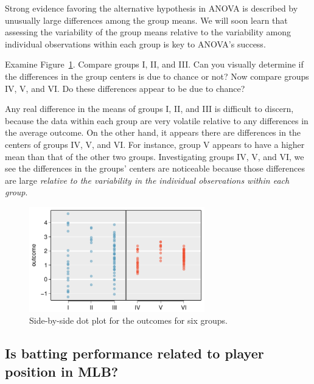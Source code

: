 Strong evidence favoring the alternative hypothesis in ANOVA is described by unusually large differences among the group means. We will soon learn that assessing the variability of the group means relative to the variability among individual observations within each group is key to ANOVA's success.

\textC{\newpage}

\begin{example}{Examine Figure~\ref{toyANOVA}. Compare groups I, II, and III. Can you visually determine if the differences in the group centers is due to chance or not? Now compare groups IV, V, and VI. Do these differences appear to be due to chance?}

Any real difference in the means of groups I, II, and III is difficult to discern, because the data within each group are very volatile relative to any differences in the average outcome. On the other hand, it appears there are differences in the centers of groups IV, V, and VI. For instance, group V appears to have a higher mean than that of the other two groups. Investigating groups IV, V, and VI, we see the differences in the groups' centers are noticeable because those differences are large \emph{relative to the variability in the individual observations within each group}.
\end{example}

\begin{figure}[h]
\centering
\includegraphics[width=0.68\textwidth]{ch_inference_for_means/figures/toyANOVA/toyANOVA}
\caption{Side-by-side dot plot for the outcomes for six groups.}
\label{toyANOVA}
\end{figure}


\subsection{Is batting performance related to player position in MLB?}


